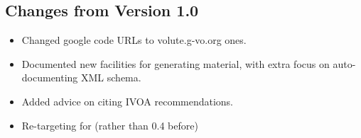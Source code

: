\documentclass[11pt,a4paper]{ivoa}
\begin{document}
\subsection{Changes from Version 1.0}
\begin{itemize}
\item Changed google code URLs to volute.g-vo.org ones.
\item Documented new facilities for generating material, with extra
focus on auto-documenting XML schema.
\item Added advice on citing IVOA recommendations.
\item Re-targeting for  (rather than 0.4 before)
\end{itemize}



\end{document}
